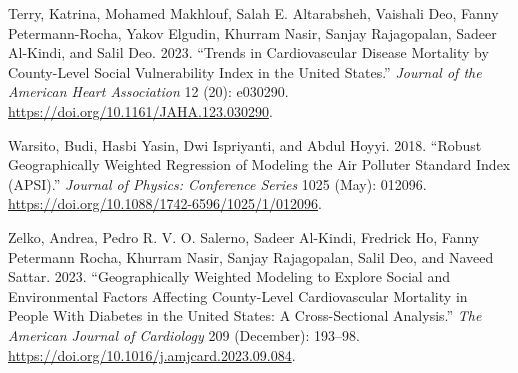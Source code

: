 \documentclass[
]{article}
\newlength{\cslhangindent}
\newenvironment{CSLReferences}[2] %
 {\begin{list}{}{%
  \setlength{\itemindent}{0pt}
  \setlength{\leftmargin}{0pt}
  \setlength{\parsep}{0pt}
  \ifodd #1
   \setlength{\leftmargin}{\cslhangindent}
   \setlength{\itemindent}{-1\cslhangindent}
  \fi
  \setlength{\itemsep}{#2\baselineskip}}}
 {\end{list}}
\begin{document}
\begin{CSLReferences}{1}{0}
Terry, Katrina, Mohamed Makhlouf, Salah E. Altarabsheh, Vaishali Deo,
Fanny Petermann-Rocha, Yakov Elgudin, Khurram Nasir, Sanjay Rajagopalan,
Sadeer Al-Kindi, and Salil Deo. 2023. {``Trends in {Cardiovascular}
{Disease} {Mortality} by {County}-{Level} {Social} {Vulnerability}
{Index} in the {United} {States}.''} \emph{Journal of the American Heart
Association} 12 (20): e030290.
\url{https://doi.org/10.1161/JAHA.123.030290}.

Warsito, Budi, Hasbi Yasin, Dwi Ispriyanti, and Abdul Hoyyi. 2018.
{``Robust Geographically Weighted Regression of Modeling the {Air}
{Polluter} {Standard} {Index} ({APSI}).''} \emph{Journal of Physics:
Conference Series} 1025 (May): 012096.
\url{https://doi.org/10.1088/1742-6596/1025/1/012096}.

Zelko, Andrea, Pedro R. V. O. Salerno, Sadeer Al-Kindi, Fredrick Ho,
Fanny Petermann Rocha, Khurram Nasir, Sanjay Rajagopalan, Salil Deo, and
Naveed Sattar. 2023. {``Geographically {Weighted} {Modeling} to
{Explore} {Social} and {Environmental} {Factors} {Affecting}
{County}-{Level} {Cardiovascular} {Mortality} in {People} {With}
{Diabetes} in the {United} {States}: {A} {Cross}-{Sectional}
{Analysis}.''} \emph{The American Journal of Cardiology} 209 (December):
193--98. \url{https://doi.org/10.1016/j.amjcard.2023.09.084}.

\end{CSLReferences}
\end{document}
